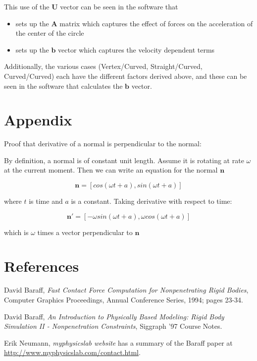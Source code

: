 \documentclass[final]{article}
\begin{document}
This use of the $\mathbf{U}$ vector can be seen in the software that

\begin{itemize}

  \item sets up the $\mathbf{A}$ matrix which captures the effect of forces on the
    acceleration of the center of the circle

  \item sets up the $\mathbf{b}$ vector which captures the velocity dependent terms

\end{itemize}

Additionally, the various cases (Vertex/Curved, Straight/Curved, Curved/Curved) each
have the different factors derived above, and these can be seen in the software that
calculates the $\mathbf{b}$ vector.




\section{Appendix}

Proof that derivative of a normal is perpendicular to the normal:

By definition, a normal is of constant unit length. Assume it is rotating at rate
$\omega$ at the current moment. Then we can write an equation for the normal
$\mathbf{n}$

\[
\mathbf{n} = [cos(\omega t + a), sin(\omega t + a)]
\]

where $t$ is time and $a$ is a constant.  Taking derivative with respect to time:

\[
\mathbf{n}' = [-\omega sin(\omega t + a), \omega cos(\omega t + a) ]
\]

which is $\omega$ times a vector perpendicular to $\mathbf{n}$



\section{References}

\begin{thebibliography}{9}
  David Baraff,
  \emph{Fast Contact Force Computation for Nonpenetrating Rigid Bodies},
  Computer Graphics Proceedings, Annual Conference Series, 1994; pages 23-34.

  David Baraff,
  \emph{An Introduction to Physically Based Modeling: Rigid Body Simulation
  II - Nonpenetration Constraints},
  Siggraph '97 Course Notes.

  Erik Neumann,
  \emph{myphysicslab website} has a summary of the Baraff paper at\\
  \url{http://www.myphysicslab.com/contact.html}.

\end{thebibliography}

\end{document}
